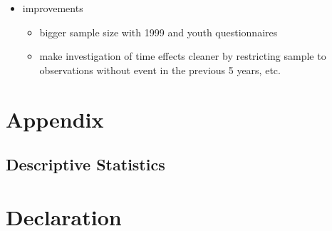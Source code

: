 \documentclass[12pt, a4paper, fleqn, parskip]{scrartcl}
\begin{document}
\begin{itemize}
	\item improvements
	\begin{itemize}
		\item bigger sample size with 1999 and youth questionnaires
		\item make investigation of time effects cleaner by restricting sample
		to observations without event in the previous 5 years, etc.
	\end{itemize}
\end{itemize}

\printbibliography

\appendix
\setcounter{secnumdepth}{0}
\section{Appendix}

\subsection{Descriptive Statistics} %
\label{sub:descriptive_statistics}
















\newpage
\setcounter{secnumdepth}{0}
\section{Declaration}
\end{document}
